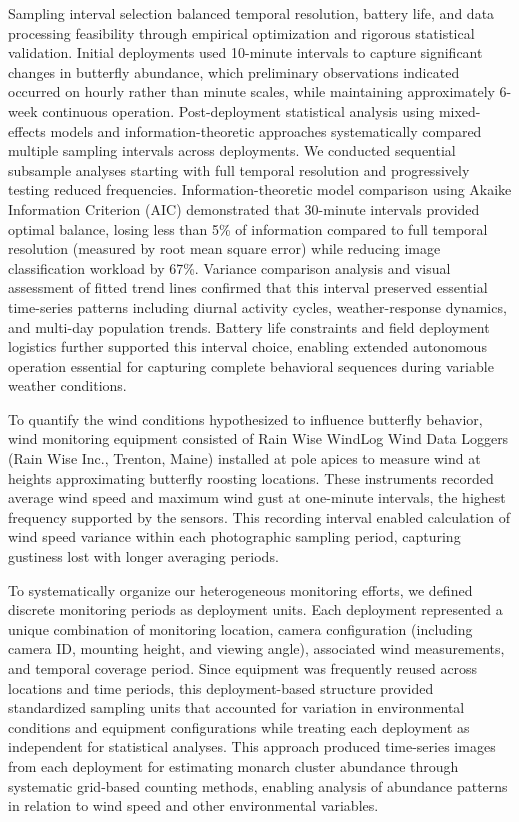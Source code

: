 Sampling interval selection balanced temporal resolution, battery life, and data processing feasibility through empirical optimization and rigorous statistical validation. Initial deployments used 10-minute intervals to capture significant changes in butterfly abundance, which preliminary observations indicated occurred on hourly rather than minute scales, while maintaining approximately 6-week continuous operation. Post-deployment statistical analysis using mixed-effects models and information-theoretic approaches systematically compared multiple sampling intervals across deployments. We conducted sequential subsample analyses starting with full temporal resolution and progressively testing reduced frequencies. Information-theoretic model comparison using Akaike Information Criterion (AIC) demonstrated that 30-minute intervals provided optimal balance, losing less than 5\% of information compared to full temporal resolution (measured by root mean square error) while reducing image classification workload by 67\%. Variance comparison analysis and visual assessment of fitted trend lines confirmed that this interval preserved essential time-series patterns including diurnal activity cycles, weather-response dynamics, and multi-day population trends. Battery life constraints and field deployment logistics further supported this interval choice, enabling extended autonomous operation essential for capturing complete behavioral sequences during variable weather conditions.

To quantify the wind conditions hypothesized to influence butterfly behavior, wind monitoring equipment consisted of Rain Wise WindLog Wind Data Loggers (Rain Wise Inc., Trenton, Maine) installed at pole apices to measure wind at heights approximating butterfly roosting locations. These instruments recorded average wind speed and maximum wind gust at one-minute intervals, the highest frequency supported by the sensors. This recording interval enabled calculation of wind speed variance within each photographic sampling period, capturing gustiness lost with longer averaging periods. 

To systematically organize our heterogeneous monitoring efforts, we defined discrete monitoring periods as deployment units. Each deployment represented a unique combination of monitoring location, camera configuration (including camera ID, mounting height, and viewing angle), associated wind measurements, and temporal coverage period. Since equipment was frequently reused across locations and time periods, this deployment-based structure provided standardized sampling units that accounted for variation in environmental conditions and equipment configurations while treating each deployment as independent for statistical analyses. This approach produced time-series images from each deployment for estimating monarch cluster abundance through systematic grid-based counting methods, enabling analysis of abundance patterns in relation to wind speed and other environmental variables.

